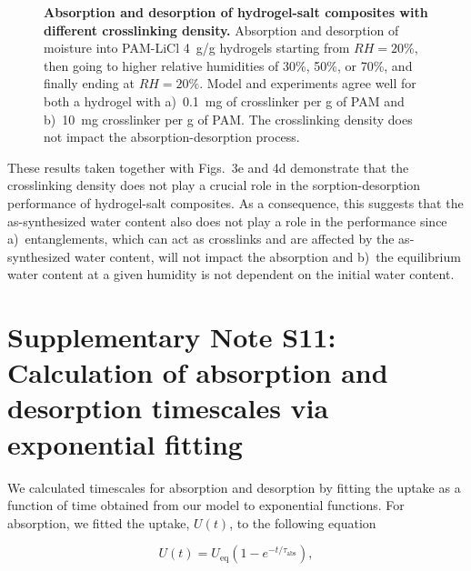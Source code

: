 \documentclass[11pt]{article}
\begin{document}
\begin{figure}[htbp]
\centering
{}
\caption{\textbf{Absorption and desorption of hydrogel-salt composites with different crosslinking density.} Absorption and desorption of moisture into PAM-LiCl 4~g/g hydrogels starting from $RH=20\%$, then going to higher relative humidities of 30\%, 50\%, or 70\%, and finally ending at $RH=20\%$. Model and experiments agree well for both a hydrogel with a)~0.1~mg of crosslinker per g of PAM and b)~10~mg crosslinker per g of PAM. The crosslinking density does not impact the absorption-desorption process.}
\label{fig:S8}
\end{figure}

These results taken together with Figs.~3e and 4d demonstrate that the crosslinking density does not play a crucial role in the sorption-desorption performance of hydrogel-salt composites. As a consequence, this suggests that the as-synthesized water content also does not play a role in the performance since a)~entanglements, which can act as crosslinks and are affected by the as-synthesized water content,\cite{kim2021} will not impact the absorption and b)~the equilibrium water content at a given humidity is not dependent on the initial water content.

\clearpage

\section*{Supplementary Note S11: Calculation of absorption and desorption timescales via exponential fitting}

We calculated timescales for absorption and desorption by fitting the uptake as a function of time obtained from our model to exponential functions.\cite{diazmarin2022,elfil2023,aristov2012} For absorption, we fitted the uptake, $U(t)$, to the following equation

\begin{equation}
U(t) = U_\mathrm{eq}\left(1 - e^{-t/\tau_\mathrm{abs}}\right), \tag{S33}
\end{equation}
\end{document}
